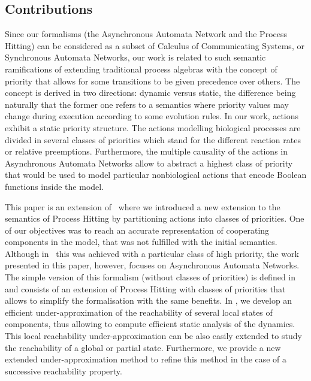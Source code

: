 \subsection*{Contributions}
Since our formalisms (the Asynchronous Automata Network and the Process Hitting)
can be considered as a subset of Calculus of Communicating Systems,
or Synchronous Automata Networks,
our work is related to such semantic ramifications of extending traditional process algebras with the concept of priority that allows for some transitions to be given precedence over others.
The concept is derived in two directions: dynamic versus static, the difference being naturally that the former one refers to a semantics where priority values may change during execution according to some evolution rules.
In our work, actions exhibit a static priority structure.
The actions modelling biological processes are divided in several classes of priorities which stand for the different reaction rates or relative preemptions.
Furthermore, the multiple causality of the actions in Asynchronous Automata Networks
allow to abstract a highest class of priority that would be used
to model particular nonbiological actions
that encode Boolean functions inside the model.

This paper is an extension of~\cite{FPMR13-CS2Bio} where we
introduced a new extension to the semantics of Process Hitting
by partitioning actions into classes of priorities.
One of our objectives was to reach an accurate representation of cooperating components in the model, that was not fulfilled with the initial semantics.
Although in~\cite{FPMR13-CS2Bio} this was achieved with a particular class of high priority,
the work presented in this paper, however, focuses on Asynchronous Automata Networks.
The simple version of this formalism (without classes of priorities)
is defined in 
and consists of an extension of Process Hitting with classes of priorities
that allows to simplify the formalisation with the same benefits.
In ,
we develop an efficient under-approximation of the reachability
of several local states of components,
thus allowing to compute efficient static analysis of the dynamics.
This local reachability under-approximation can be also easily extended to study the reachability of a global or partial state.
Furthermore, we provide a new extended under-approximation method to refine this method
in the case of a successive reachability property.

